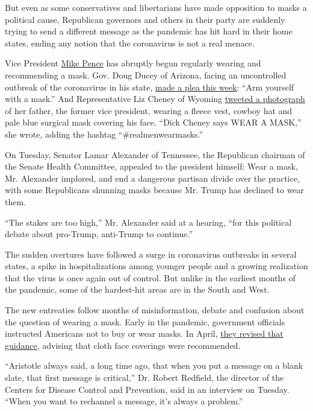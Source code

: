 But even as some conservatives and libertarians have made opposition to
masks a political cause, Republican governors and others in their party
are suddenly trying to send a different message as the pandemic has hit
hard in their home states, ending any notion that the coronavirus is not
a real menace.

Vice President
\href{https://www.nytimes.com/2020/07/02/us/politics/pence-covid.html}{Mike
Pence} has abruptly begun regularly wearing and recommending a mask.
Gov. Doug Ducey of Arizona, facing an uncontrolled outbreak of the
coronavirus in his state,
\href{https://www.youtube.com/watch?v=UdDE5AhXlV8}{made a plea this
week}: ``Arm yourself with a mask.'' And Representative Liz Cheney of
Wyoming
\href{https://twitter.com/Liz_Cheney/status/1276591702321647616?s=20}{tweeted
a photograph} of her father, the former vice president, wearing a fleece
vest, cowboy hat and pale blue surgical mask covering his face. ``Dick
Cheney says WEAR A MASK,'' she wrote, adding the hashtag
``\#realmenwearmasks.''

On Tuesday, Senator Lamar Alexander of Tennessee, the Republican
chairman of the Senate Health Committee, appealed to the president
himself: Wear a mask, Mr. Alexander implored, and end a dangerous
partisan divide over the practice, with some Republicans shunning masks
because Mr. Trump has declined to wear them.

``The stakes are too high,'' Mr. Alexander said at a hearing, ``for this
political debate about pro-Trump, anti-Trump to continue.''

The sudden overtures have followed a surge in coronavirus outbreaks in
several states, a spike in hospitalizations among younger people and a
growing realization that the virus is once again out of control. But
unlike in the earliest months of the pandemic, some of the hardest-hit
areas are in the South and West.

The new entreaties follow months of misinformation, debate and confusion
about the question of wearing a mask. Early in the pandemic, government
officials instructed Americans not to buy or wear masks. In April,
\href{https://www.cdc.gov/coronavirus/2019-ncov/prevent-getting-sick/cloth-face-cover-guidance.html?CDC_AA_refVal=https\%3A\%2F\%2Fwww.cdc.gov\%2Fcoronavirus\%2F2019-ncov\%2Fprevent-getting-sick\%2Fcloth-face-cover.html}{they
revised that guidance}, advising that cloth face coverings were
recommended.

``Aristotle always said, a long time ago, that when you put a message on
a blank slate, that first message is critical,'' Dr. Robert Redfield,
the director of the Centers for Disease Control and Prevention, said in
an interview on Tuesday. ``When you want to rechannel a message, it's
always a problem.''

